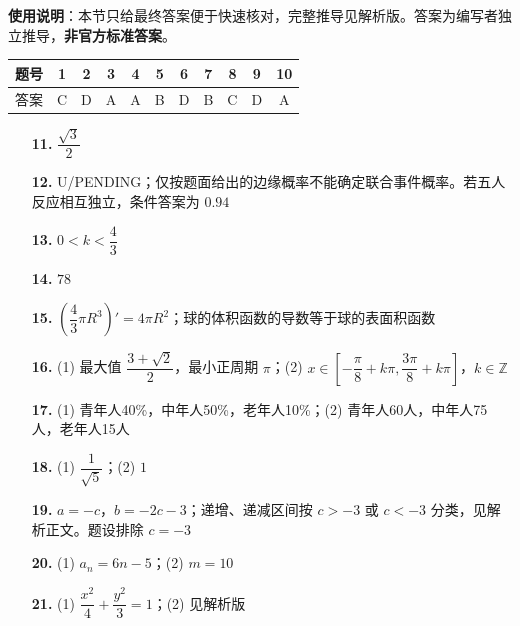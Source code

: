 
\begin{gknotice}
\textbf{使用说明}：本节只给最终答案便于快速核对，完整推导见解析版。答案为编写者独立推导，\textbf{非官方标准答案}。
\end{gknotice}

\begin{center}\begin{tabular}{ccccccccccc}
\toprule
题号 & 1 & 2 & 3 & 4 & 5 & 6 & 7 & 8 & 9 & 10 \\
\midrule
答案 & C & D & A & A & B & D & B & C & D & A \\
\bottomrule
\end{tabular}\end{center}

\begin{itemize}[leftmargin=2.6em]
  \item[\textbf{11.}] $\dfrac{\sqrt3}{2}$
  \item[\textbf{12.}] U/PENDING；仅按题面给出的边缘概率不能确定联合事件概率。若五人反应相互独立，条件答案为 $0.94$
  \item[\textbf{13.}] $0<k<\dfrac43$
  \item[\textbf{14.}] $78$
  \item[\textbf{15.}] $\left(\dfrac43\pi R^3\right)'=4\pi R^2$；球的体积函数的导数等于球的表面积函数
\end{itemize}

\begin{itemize}[leftmargin=2.6em]
  \item[\textbf{16.}] (1) 最大值 $\dfrac{3+\sqrt2}{2}$，最小正周期 $\pi$；(2) $x\in[-\dfrac\pi8+k\pi,\dfrac{3\pi}8+k\pi]$，$k\in\mathbb Z$
  \item[\textbf{17.}] (1) 青年人40\%，中年人50\%，老年人10\%；(2) 青年人60人，中年人75人，老年人15人
  \item[\textbf{18.}] (1) $\dfrac1{\sqrt5}$；(2) $1$
  \item[\textbf{19.}] $a=-c$，$b=-2c-3$；递增、递减区间按 $c>-3$ 或 $c<-3$ 分类，见解析正文。题设排除 $c=-3$
  \item[\textbf{20.}] (1) $a_n=6n-5$；(2) $m=10$
  \item[\textbf{21.}] (1) $\dfrac{x^2}{4}+\dfrac{y^2}{3}=1$；(2) 见解析版
\end{itemize}

